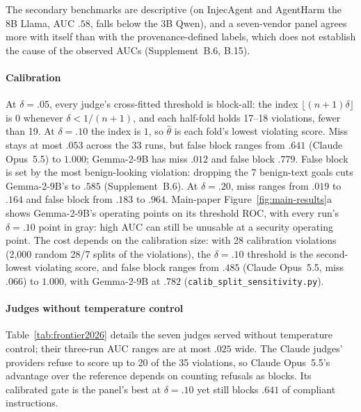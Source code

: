 The secondary benchmarks are descriptive (on InjecAgent and AgentHarm the 8B Llama,
AUC $.58$, falls below the 3B Qwen), and a seven-vendor panel agrees more with itself
than with the provenance-defined labels, which does not establish the cause of the
observed AUCs (Supplement~B.6, B.15).

\paragraph{Calibration}
At $\delta=.05$, every judge's cross-fitted threshold is block-all: the index
$\lfloor(n{+}1)\delta\rfloor$ is $0$ whenever $\delta<1/(n{+}1)$, and each half-fold
holds 17--18 violations, fewer than 19. At $\delta=.10$ the index is $1$, so
$\hat\theta$ is each fold's lowest violating score. Miss stays at most $.053$ across
the 33 runs, but false block ranges from $.641$ (Claude Opus~5.5) to $1.000$;
Gemma-2-9B has miss $.012$ and false block $.779$. False block is set by the most
benign-looking violation: dropping the 7 benign-text goals cuts Gemma-2-9B's to
$.585$ (Supplement~B.6). At $\delta=.20$, miss ranges from $.019$ to $.164$ and false
block from $.183$ to $.964$. Main-paper Figure~\ref{fig:main-results}a shows Gemma-2-9B's
operating points on its threshold ROC, with every run's $\delta=.10$ point in gray: high
AUC can still be unusable at a security operating point. The cost depends on the
calibration size: with 28 calibration violations (2,000 random 28/7 splits of the
violations), the $\delta=.10$ threshold is the second-lowest violating score, and false
block ranges from $.485$ (Claude Opus~5.5, miss $.066$) to $1.000$, with Gemma-2-9B at
$.782$ (\texttt{calib\_split\_sensitivity.py}).


\paragraph{Judges without temperature control}
Table~\ref{tab:frontier2026} details the seven judges served without temperature
control; their three-run AUC ranges are at most $.025$ wide. The Claude
judges' providers refuse to score up to 20 of the 35 violations, so Claude
Opus~5.5's advantage over the reference depends on counting refusals as blocks.
Its calibrated gate is the panel's best at $\delta=.10$ yet still blocks $.641$ of
compliant instructions.

